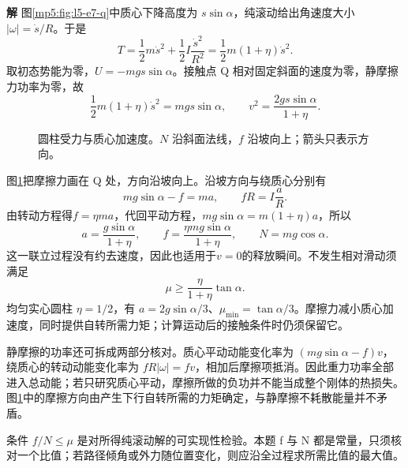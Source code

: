 \documentclass[11pt,openany,fontset=fandol]{ctexbook}
\theoremstyle{definition}\newtheorem{example}{例}[chapter]\newtheorem{exercise}{习题}[chapter]
\newcommand{\SolutionStart}{\par\medskip\ifdim\pagetotal>0pt\ifdim\dimexpr\pagegoal-\pagetotal\relax<3\baselineskip\newpage\fi\fi\noindent\textbf{解}\quad\ignorespaces}
\newenvironment{solution}{\SolutionStart}{\par\medskip}
\begin{document}
\begin{solution}
图\ref{mp5:fig:l5-e7-q}中质心下降高度为 $s\sin\alpha$，纯滚动给出角速度大小 $|\omega|=\dot s/R$。于是
\[
T=\frac12m\dot s^2+\frac12I\frac{\dot s^2}{R^2}
=\frac12m(1+\eta)\dot s^2.
\]
取初态势能为零，$U=-mgs\sin\alpha$。接触点 Q 相对固定斜面的速度为零，静摩擦力功率为零，故
\[
\frac12m(1+\eta)\dot s^2=mgs\sin\alpha,
\qquad \boxed{v^2=\frac{2gs\sin\alpha}{1+\eta}}.
\]

\begin{figure}[H]\centering
{}
\caption{圆柱受力与质心加速度。$N$ 沿斜面法线，$f$ 沿坡向上；箭头只表示方向。}\label{mp5:fig:l5-e7-s}
\end{figure}

图\ref{mp5:fig:l5-e7-s}把摩擦力画在 Q 处，方向沿坡向上。沿坡方向与绕质心分别有
\[
mg\sin\alpha-f=ma,\qquad fR=I\frac aR.
\]
由转动方程得$f=\eta ma$，代回平动方程，$mg\sin\alpha=m(1+\eta)a$，所以
\[
\boxed{a=\frac{g\sin\alpha}{1+\eta}},\qquad
f=\frac{\eta mg\sin\alpha}{1+\eta},\qquad N=mg\cos\alpha.
\]
这一联立过程没有约去速度，因此也适用于$v=0$的释放瞬间。不发生相对滑动须满足
\[
\boxed{\mu\ge\frac{\eta}{1+\eta}\tan\alpha.}
\]
均匀实心圆柱 $\eta=1/2$，有 $a=2g\sin\alpha/3$、$\mu_{\min}=\tan\alpha/3$。摩擦力减小质心加速度，同时提供自转所需力矩；计算运动后的接触条件时仍须保留它。

静摩擦的功率还可拆成两部分核对。质心平动动能变化率为 $(mg\sin\alpha-f)v$，绕质心的转动动能变化率为 $fR|\omega|=fv$，相加后摩擦项抵消。因此重力功率全部进入总动能；若只研究质心平动，摩擦所做的负功并不能当成整个刚体的热损失。图\ref{mp5:fig:l5-e7-s}中的摩擦方向由产生下行自转所需的力矩确定，与静摩擦不耗散能量并不矛盾。

条件 $f/N\le\mu$ 是对所得纯滚动解的可实现性检验。本题 f 与 N 都是常量，只须核对一个比值；若路径倾角或外力随位置变化，则应沿全过程求所需比值的最大值。

\end{solution}
\end{document}
